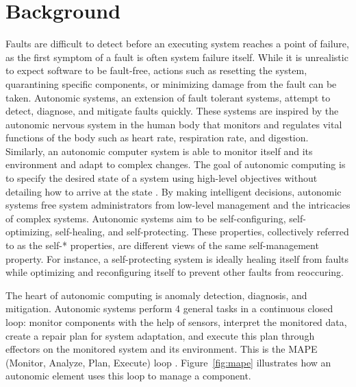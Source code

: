 \section{Background}
\label{sec:background}
Faults are difficult to detect before an executing system reaches a point of failure, as the first symptom of a fault is often system failure itself. While it is unrealistic to expect software to be fault-free, actions such as resetting the system, quarantining specific components, or minimizing damage from the fault can be taken. Autonomic systems, an extension of fault tolerant systems, attempt to detect, diagnose, and mitigate faults quickly. These systems are inspired by the autonomic nervous system in the human body that monitors and regulates vital  functions of the body such as heart rate, respiration rate, and digestion. Similarly, an autonomic computer system is able to monitor itself and its environment and adapt to complex changes. The goal of autonomic computing is to specify the desired state of a system using high-level objectives without detailing how to arrive at the state \cite{1160055,4061119,1301340}. By making intelligent decisions, autonomic systems free system administrators from low-level management and the intricacies of complex systems. Autonomic systems aim to be self-configuring, self-optimizing, self-healing, and self-protecting. These properties, collectively referred to as the self-* properties, are different views of the same self-man\-age\-ment property. For instance, a self-protecting system is ideally healing itself from faults while optimizing and reconfiguring itself to prevent other faults from reoccuring.

The heart of autonomic computing is anomaly detection, diagnosis, and mitigation. Autonomic systems perform 4 general tasks in a continuous closed loop: monitor components with the help of sensors, interpret the monitored data, create a repair plan for system adaptation, and execute this plan through effectors on the monitored system and its environment. This is the MAPE (Monitor, Analyze, Plan, Execute) loop \cite{1160055}. Figure~\ref{fig:mape} illustrates how an autonomic element uses this loop to manage a component.

